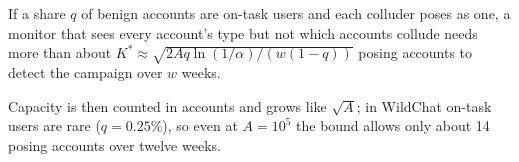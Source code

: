 \begin{corollary}\label{cor:types}
If a share $q$ of benign accounts are on-task users and each colluder poses as one, a monitor that sees every account's type but not which accounts collude needs more than about $K^*\approx\sqrt{2Aq\ln(1/\alpha)/(w(1-q))}$ posing accounts to detect the campaign over $w$ weeks.
\end{corollary}

Capacity is then counted in accounts and grows like $\sqrt A$; in WildChat on-task users are rare ($q=0.25\%$), so even at $A=10^5$ the bound allows only about 14 posing accounts over twelve weeks.
